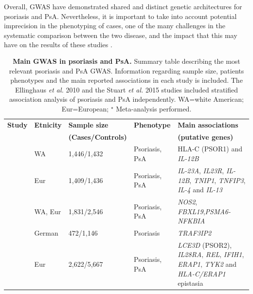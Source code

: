 Overall, GWAS have demonstrated shared and distinct genetic architectures for psoriasis and PsA. Nevertheless, it is important to take into account potential imprecision in the phenotyping of cases, one of the many challenges in the systematic comparison between the two disease, and the impact that this may have on the results of these studies .

%
\begin{landscape}
\begin{center}
\renewcommand{\arraystretch}{0.7}	
\begin{longtable}[ht]{p{.25\textheight} p{.25\textheight} p{.20\textheight} p{.20\textheight} p{.50\textheight}}
\caption[Main GWAS in psoriasis and PsA]{\textbf{Main GWAS in psoriasis and PsA.} Summary table describing the most relevant psoriasis and PsA GWAS. Information regarding sample size, patients phenotypes and the main reported associations in each study is included. The Ellinghaus \textit{et al.} 2010 and the Stuart \textit{et al.} 2015 studies included stratified association analysis of psoriasis and PsA independently. WA=white American; Eur=European; $^\star$ Meta-analysis performed.}
\label{tab:GWAS_summary} \\
\toprule
\textbf{Study} & \textbf{Etnicity} & \textbf{Sample size}      & \textbf{Phenotype} & \textbf{Main associations} \\
               &                   & \textbf{(Cases/Controls)} &                    &  \textbf{(putative genes)}                  \\
\midrule
\midrule
\parencite{Cargill2007} &	WA &	1,446/1,432 &	Psoriasis, PsA &	HLA-C (PSOR1) and \textit{IL-12B} \\
\parencite{Nair2009} &	Eur	& 1,409/1,436 &	Psoriasis, PsA &	\textit{IL-23A}, \textit{IL23R}, \textit{IL-12B}, \textit{TNIP1}, \textit{TNFIP3}, \textit{IL-4} and \textit{IL-13} \\
\parencite{Stuart2010} &	WA, Eur &	1,831/2,546	& Psoriasis, PsA &	\textit{NOS2}, \textit{FBXL19},\textit{PSMA6-NFKBIA} \\

\parencite{Ellinghaus2010} &	German	& 472/1,146	& Psoriasis	& \textit{TRAF3IP2} \\

\parencite{Strange2010} &	Eur & 2,622/5,667 & Psoriasis, PsA & \textit{LCE3D} (PSOR2), \textit{IL28RA}, \textit{REL}, \textit{IFIH1}, \textit{ERAP1}, \textit{TYK2} and \textit{HLA-C/ERAP1} epistasia \\


\end{longtable}
\end{center}
\end{landscape}

